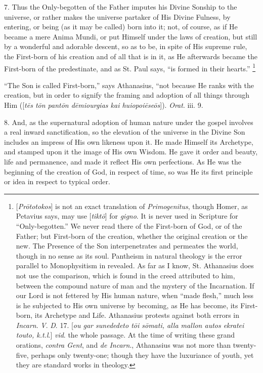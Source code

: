 7. Thus the Only-begotten of the Father imputes his Divine Sonship
to the universe, or rather makes the universe partaker of His Divine
Fulness, by entering, or being (as it may be called) born into it;
not, of course, as if He became a mere Anima Mundi, or put Himself
under the laws of creation, but still by a wonderful and adorable
descent, so as to be, in spite of His supreme rule, the First-born of
his creation and of all that is in it, as He afterwards became the
First-born of the predestinate, and as St. Paul says, ``is
formed in their hearts.'' \footnote{[\emph{Pr\={o}totokos}] is not an exact translation of \emph{Primogenitus}, though Homer, as Petavius says, may use [\emph{tikt\={o}}]
for \emph{gigno}. It is never used in Scripture for
``Only-begotten.'' We never read there of the First-born of
God, or of the Father; but First-born of the creation, whether the
original creation or the new. The Presence of the Son interpenetrates
and permeates the world, though in no sense as its soul. Pantheism in
natural theology is the error parallel to Monophysitism in revealed.
As far as I know, St. Athanasius does not use the comparison, which is
found in the creed attributed to him, between the compound nature of
man and the mystery of the Incarnation. If our Lord is not fettered by
His human nature, when ``made flesh,'' much less is he
subjected to His own universe by becoming, as He has become, its
First-born, its Archetype and Life. Athanasius protests against both
errors in \emph{Incarn}. \emph{V}. \emph{D}. 17. [\emph{ou gar sunededeto
t\={o}i s\={o}mati, alla mallon autos ekratei touto, k.t.l}.]
\emph{vid}. the whole passage. At the time of writing these grand
orations, \emph{contra Gent}, and \emph{de Incarn}., Athanasius was
not more than twenty-five, perhaps only twenty-one; though they have
the luxuriance of youth, yet they are standard works in theology.}

``The Son is called First-born,'' says Athanasius,
``not because He ranks with the creation, but in order to signify
the framing and adoption of all things through Him ([\emph{t\={e}s t\={o}n
pant\={o}n d\={e}miourgias kai huiopoi\={e}se\={o}s}]).
\emph{Orat}. iii. 9.

8. And, as the supernatural adoption of human nature under the
gospel involves a real inward sanctification, so the elevation of the
universe in the Divine Son includes an impress of His own likeness
upon it. He made Himself its Archetype, and stamped upon it the image
of His own Wisdom. He gave it order and beauty, life and permanence,
and made it reflect His own perfections. As He was the beginning
of the creation of God, in respect of time, so was He its first
principle or idea in respect to typical order.

